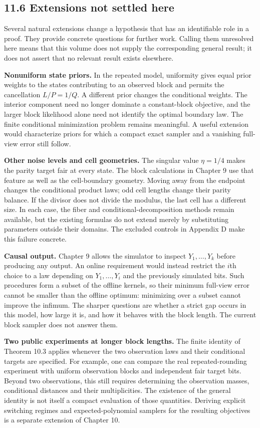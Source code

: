 \documentclass[
]{article}
\begin{document}
\subsection{11.6 Extensions not settled
here}\label{extensions-not-settled-here}

Several natural extensions change a hypothesis that has an identifiable
role in a proof. They provide concrete questions for further work.
Calling them unresolved here means that this volume does not supply the
corresponding general result; it does not assert that no relevant result
exists elsewhere.

\textbf{Nonuniform state priors.} In the repeated model, uniformity
gives equal prior weights to the states contributing to an observed
block and permits the cancellation \(L/P=1/Q\). A different prior
changes the conditional weights. The interior component need no longer
dominate a constant-block objective, and the larger block likelihood
alone need not identify the optimal boundary law. The finite conditional
minimization problem remains meaningful. A useful extension would
characterize priors for which a compact exact sampler and a vanishing
full-view error still follow.

\textbf{Other noise levels and cell geometries.} The singular value
\(\eta=1/4\) makes the parity target fair at every state. The block
calculations in Chapter 9 use that feature as well as the cell-boundary
geometry. Moving away from the endpoint changes the conditional product
laws; odd cell lengths change their parity balance. If the divisor does
not divide the modulus, the last cell has a different size. In each
case, the fiber and conditional-decomposition methods remain available,
but the existing formulas do not extend merely by substituting
parameters outside their domains. The excluded controls in Appendix D
make this failure concrete.

\textbf{Causal output.} Chapter 9 allows the simulator to inspect
\(Y_1,\ldots,Y_k\) before producing any output. An online requirement
would instead restrict the \(i\)th choice to a law depending on
\(Y_1,\ldots,Y_i\) and the previously simulated bits. Such procedures
form a subset of the offline kernels, so their minimum full-view error
cannot be smaller than the offline optimum: minimizing over a subset
cannot improve the infimum. The sharper questions are whether a strict
gap occurs in this model, how large it is, and how it behaves with the
block length. The current block sampler does not answer them.

\textbf{Two public experiments at longer block lengths.} The finite
identity of Theorem 10.3 applies whenever the two observation laws and
their conditional targets are specified. For example, one can compare
the real repeated-rounding experiment with uniform observation blocks
and independent fair target bits. Beyond two observations, this still
requires determining the observation masses, conditional distances and
their multiplicities. The existence of the general identity is not
itself a compact evaluation of those quantities. Deriving explicit
switching regimes and expected-polynomial samplers for the resulting
objectives is a separate extension of Chapter 10.
\end{document}
